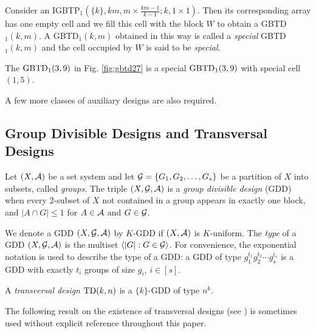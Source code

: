 \documentclass[draft, 11pt]{article}
\begin{document}
 Consider an IGBTP$_1(\{k\},km,m\times \frac{km-1}{k-1};k,1\times 1)$. 
 Then its corresponding array has one empty cell and 
 we fill this cell with the block $W$ to obtain a GBTD$_1(k,m)$.
A GBTD$_1(k,m)$ obtained in this way is called a {\em special}
 GBTD$_1(k,m)$ and the cell occupied by $W$ is said to be {\em special}.

 \begin{example}
 \label{eg:9} The $\textrm{GBTD}_1(3,9)$ in Fig. \ref{fig:gbtd27} is a
 special $\textrm{GBTD}_1(3,9)$ with special cell $(1,5)$.
 \end{example}


 A few more classes of auxiliary designs are also required.

\subsection{Group Divisible Designs and Transversal Designs}


\begin{definition}
Let $(X,\mathcal A)$ be a set system and let $\mathcal G=\{G_1,G_2,\ldots,G_s\}$ be a partition of $X$ into
subsets, called {\em groups}. The triple $(X,\mathcal G,\mathcal A)$ is a {\em group divisible design} (GDD)
when every $2$-subset of $X$ not contained in a group appears in exactly one block,
and $|A\cap G|\leq 1$ for $A\in\mathcal A$ and $G\in\mathcal G$.
\end{definition}

We denote a GDD $(X,\mathcal G,\mathcal A)$ by $K$-GDD if $(X,\mathcal A)$ is $K$-uniform. The {\em type}
of a GDD $(X,\mathcal G,\mathcal A)$ is the multiset $\langle |G| : G\in\mathcal G\rangle$.
For convenience, the exponential
notation is used to describe the type of a GDD: a GDD of type $g_1^{t_1} g_2^{t_2} \cdots
g_s^{t_s}$ is a GDD with exactly $t_i$ groups of size $g_i$, $i\in[s]$.

                                                       
\begin{definition}
A {\em transversal design} $\textrm{TD}(k,n)$ is a $\{k\}$-GDD of type $n^k$.
\end{definition}
                                                       

The following result on the existence of transversal designs (see \cite{Abeletal:2007})
is sometimes used without explicit reference throughout this paper.
                                                       
\end{document}
